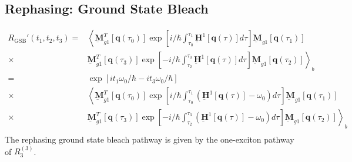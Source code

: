 \documentclass{article}
\newcommand{\bra}[1]{\ensuremath{\left\langle#1\right|}}
\newcommand{\ket}[1]{\ensuremath{\left|#1\right\rangle}}
\newcommand{\vect}[1]{\ensuremath{\boldsymbol{\mathbf{#1}}}}
\newcommand{\arw}{-{Latex[length=2mm]}}
\begin{document}
\subsection{Rephasing: Ground State Bleach}
\begin{figure}[h]
\centering
{}
\end{figure}
\begin{equation}
\begin{split}
 R_\mathrm{GSB}'(t_{1},t_{2},t_{3})=&\left\langle\underbar{\vect{M}}_{g1}^{T}[\vect q(\tau_{0})]\exp\left[i/\hbar\int_{\tau_{0}}^{\tau_{1}}\underbar{\vect{H}}^{1}[\vect q(\tau)]d\tau\right] \underbar{\vect{M}}_{g1} [\vect q(\tau_{1})]\right.\\
 \times&\left.\underbar{\vect{M}}_{g1}^{T}[\vect q(\tau_{3})]\exp\left[-i/\hbar\int_{\tau_{2}}^{\tau_{3}}\underbar{\vect{H}}^{1}[\vect q(\tau)]d\tau\right] \underbar{\vect{M}}_{g1} [\vect q(\tau_{2})]\right\rangle_{b}\\
%
 =&\exp\left[i t_{1}\omega_{0}/\hbar-it_{3}\omega_{0}/\hbar\right]\\
 \times&\left\langle\underbar{\vect{M}}_{g1}^{T}[\vect q(\tau_{0})]\exp\left[i/\hbar\int_{\tau_{0}}^{\tau_{1}}\left(\underbar{\vect{H}}^{1}[\vect q(\tau)]-\omega_{0}\right)d\tau\right] \underbar{\vect{M}}_{g1} [\vect q(\tau_{1})]\right.\\
 \times&\left.\underbar{\vect{M}}_{g1}^{T}[\vect q(\tau_{3})]\exp\left[-i/\hbar\int_{\tau_{2}}^{\tau_{3}}\left(\underbar{\vect{H}}^{1}[\vect q(\tau)]-\omega_{0}\right)d\tau\right] \underbar{\vect{M}}_{g1} [\vect q(\tau_{2})]\right\rangle_{b}\\
\end{split}
\end{equation}
The rephasing ground state bleach pathway is given by the one-exciton pathway of $R_{3}^{(3)}$.

\clearpage
\end{document}
